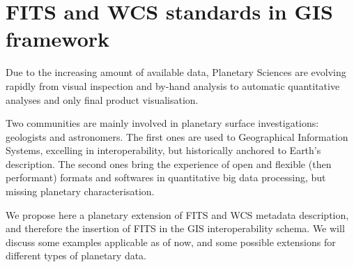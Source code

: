 \documentclass[11pt]{article}
\begin{document}
\section*{FITS and WCS standards in GIS framework}
Due to the increasing amount of available data, Planetary Sciences are evolving rapidly from visual inspection and by-hand analysis to automatic
quantitative analyses and only final product visualisation.

Two communities are mainly involved in planetary surface investigations: geologists and astronomers.
The first ones are used to Geographical Information Systems, excelling in interoperability, but historically anchored to Earth's description.
The second ones bring the experience of open and flexible (then performant) formats and softwares in quantitative big data processing, but missing planetary
characterisation.

We propose here a planetary extension of FITS and WCS metadata description, and therefore the insertion of FITS in the GIS interoperability schema.
We will discuss some examples applicable as of now, and some possible extensions for different types of planetary data. 
\end{document}
